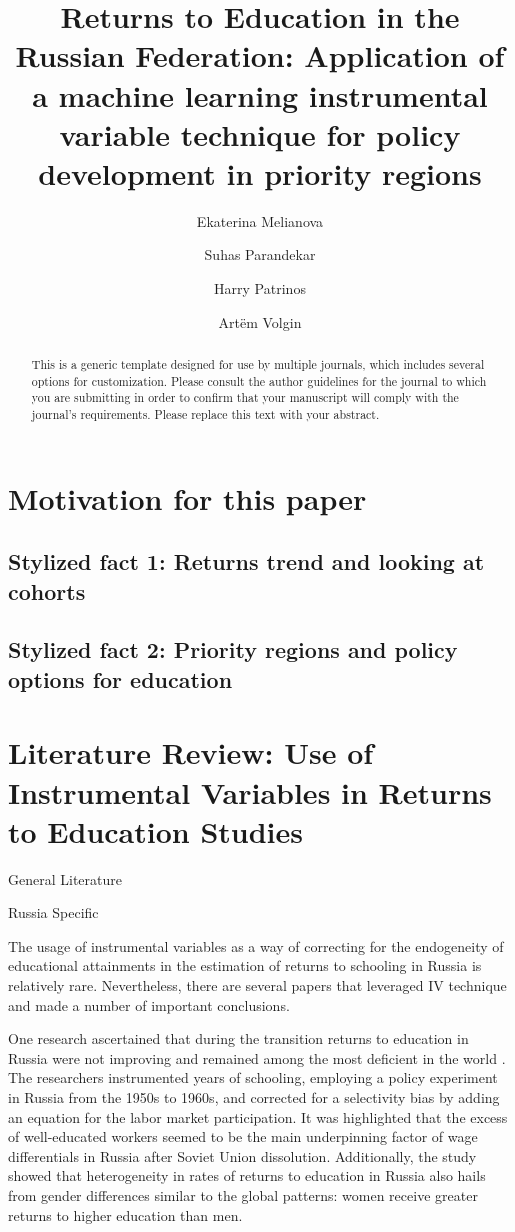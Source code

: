 \documentclass[alpha-refs]{wiley-article-04t}
\title{Returns to Education in the Russian Federation: Application of a machine learning instrumental variable technique for policy development in priority regions}
\author[*]{Ekaterina Melianova}
\author[*]{\hspace{-1em}Suhas Parandekar}
\author[*]{\hspace{-1em}Harry Patrinos}
\author[*]{\hspace{-1em}Art\"{e}m Volgin}
\affil[*]{Education Global Practice, Europe and Central Asia}
\begin{document}
\maketitle

\begin{abstract}
This is a generic template designed for use by multiple journals, which includes several options for customization. Please consult the author guidelines for the journal to which you are submitting in order to confirm that your manuscript will comply with the journal's requirements. Please replace this text with your abstract.

\end{abstract}


\section{Motivation for this paper}

\subsection{Stylized fact 1: Returns trend and looking at cohorts}

\subsection{Stylized fact 2: Priority regions and policy options for education}

\lipsum[1]

\section{Literature Review: Use of Instrumental Variables in Returns to Education Studies}

General Literature


Russia Specific


The usage of instrumental variables as a way of correcting for the endogeneity of educational attainments in the estimation of returns to schooling in Russia is relatively rare. Nevertheless, there are several papers that leveraged IV technique and made a number of important conclusions.

One research ascertained that during the transition returns to education in Russia were not improving and remained among the most deficient in the world \citep{cheidvasser_educated_2007}. The researchers instrumented years of schooling, employing a policy experiment in Russia from the 1950s to 1960s, and corrected for a selectivity bias by adding an equation for the labor market participation. It was highlighted that the excess of well-educated workers seemed to be the main underpinning factor of wage differentials in Russia after Soviet Union dissolution. Additionally, the study showed that heterogeneity in rates of returns to education in Russia also hails from gender differences similar to the global patterns: women receive greater returns to higher education than men.
\end{document}
